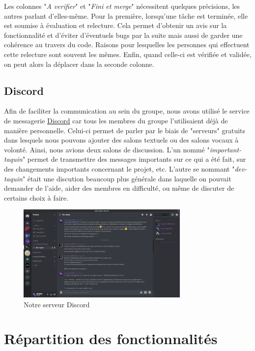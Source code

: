 			Les colonnes "\textit{A verifier}" et "\textit{Fini et merge}" nécessitent quelques précisions, les autres parlant d'elles-même. Pour la première, lorsqu'une tâche est terminée, elle est soumise à évaluation et relecture. Cela permet d'obtenir un avis sur la fonctionnalité et d'éviter d'éventuels bugs par la suite mais aussi de garder une cohérence au travers du code. Raisons pour lesquelles les personnes qui effectuent cette relecture sont souvent les mêmes. Enfin, quand celle-ci est vérifiée et validée, on peut alors la déplacer dans la seconde colonne.

		\subsection{Discord}

			Afin de faciliter la communication au sein du groupe, nous avons utilisé le service de messagerie \href{https://discordapp.com}{Discord} car tous les membres du groupe l'utilisaient déjà de manière personnelle. Celui-ci permet de parler par le biais de "serveurs" gratuits dans lesquels nous pouvons ajouter des salons textuels ou des salons vocaux à volonté. Ainsi, nous avions deux salons de discussion. L'un nommé "\textit{important-taquin}" permet de transmettre des messages importants sur ce qui a été fait, sur des changements importants concernant le projet, etc. L'autre se nommant "\textit{dev-taquin}" était une discution beaucoup plus générale dans laquelle on pouvait demander de l'aide, aider des membres en difficulté, ou même de discuter de certains choix à faire.

			\begin{figure}[H]
				\centering\includegraphics[width=0.75\textwidth, keepaspectratio]{img/discord.png}
				\caption{Notre serveur Discord}
			\end{figure}

	\section{Répartition des fonctionnalités}

